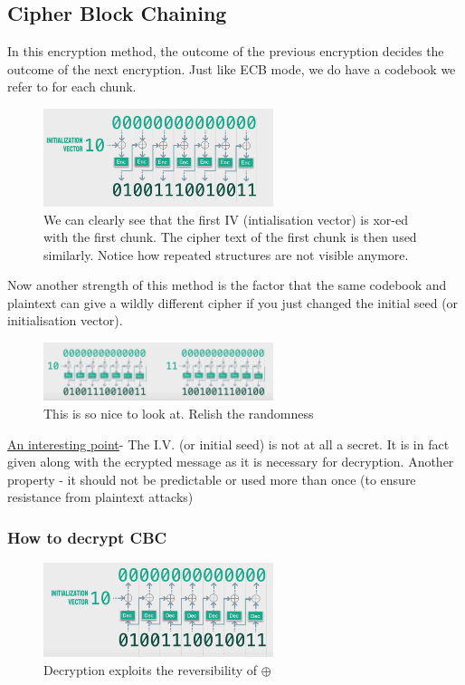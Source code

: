 		\subsection{Cipher Block Chaining}
		In this encryption method, the outcome of the previous encryption decides the outcome of the next encryption. Just like ECB mode, we do have a codebook we refer to for each chunk.
		\begin{figure}
			\caption{We can clearly see that the first IV (intialisation vector) is xor-ed with the first chunk. The cipher text of the first chunk is then used similarly. Notice how repeated structures are not visible anymore.}
			\includegraphics[width=0.6\textwidth]{Photos/Cipher_ Block_Chaining.png}
		\end{figure}
	
		Now another strength of this method is the factor that the same codebook and plaintext can give a wildly different cipher if you just changed the initial seed (or initialisation vector).
		\begin{figure}
			\caption{This is so nice to look at. Relish the randomness}
			\includegraphics[width=0.6\textwidth]{Photos/CBC_2.png}
		\end{figure}

		\underline{An interesting point}- The I.V. (or initial seed) is not at all a secret. It is in fact given along with the ecrypted message as it is necessary for decryption. Another property - it should not be predictable or used more than once (to ensure resistance from plaintext attacks)

		\subsubsection{How to decrypt CBC}
			\begin{figure}
				\caption{Decryption exploits the reversibility of \(\oplus\)}
				\includegraphics[width=0.6\textwidth]{Photos/CBC_3.png}
			\end{figure}

